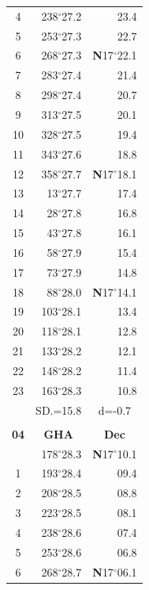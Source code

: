 \documentclass[10pt, a4paper]{report}
\begin{document}
\begin{scriptsize}
\begin{tabular*}{0.2\textwidth}[t]{@{\extracolsep{\fill}}|c|rr|}
4 & 238$^\circ$27.2 & 23.4\\
5 & 253$^\circ$27.3 & 22.7\\[2Pt]
6 & 268$^\circ$27.3 & \textbf{N}17$^\circ$22.1\\
7 & 283$^\circ$27.4 & 21.4\\
8 & 298$^\circ$27.4 & 20.7\\
9 & 313$^\circ$27.5 & \raisebox{0.24ex}{\boldmath$\cdot$~\boldmath$\cdot$~~}20.1\\
10 & 328$^\circ$27.5 & 19.4\\
11 & 343$^\circ$27.6 & 18.8\\[2Pt]
12 & 358$^\circ$27.7 & \textbf{N}17$^\circ$18.1\\
13 & 13$^\circ$27.7 & 17.4\\
14 & 28$^\circ$27.8 & 16.8\\
15 & 43$^\circ$27.8 & \raisebox{0.24ex}{\boldmath$\cdot$~\boldmath$\cdot$~~}16.1\\
16 & 58$^\circ$27.9 & 15.4\\
17 & 73$^\circ$27.9 & 14.8\\[2Pt]
18 & 88$^\circ$28.0 & \textbf{N}17$^\circ$14.1\\
19 & 103$^\circ$28.1 & 13.4\\
20 & 118$^\circ$28.1 & 12.8\\
21 & 133$^\circ$28.2 & \raisebox{0.24ex}{\boldmath$\cdot$~\boldmath$\cdot$~~}12.1\\
22 & 148$^\circ$28.2 & 11.4\\
23 & 163$^\circ$28.3 & 10.8\\
\hline
\rule{0pt}{2.4ex} & \multicolumn{1}{c}{SD.=15.8} & \multicolumn{1}{c|}{d=-0.7}\\
\hline
\multicolumn{1}{c}{}\\[-0.5ex]\hline
\multicolumn{1}{|c|}{\rule{0pt}{2.6ex}\textbf{04}} & \multicolumn{1}{c}{\textbf{GHA}} & \multicolumn{1}{c|}{\textbf{Dec}}\\
\hline\rule{0pt}{2.6ex}\noindent
0 & 178$^\circ$28.3 & \textbf{N}17$^\circ$10.1\\
1 & 193$^\circ$28.4 & 09.4\\
2 & 208$^\circ$28.5 & 08.8\\
3 & 223$^\circ$28.5 & \raisebox{0.24ex}{\boldmath$\cdot$~\boldmath$\cdot$~~}08.1\\
4 & 238$^\circ$28.6 & 07.4\\
5 & 253$^\circ$28.6 & 06.8\\[2Pt]
6 & 268$^\circ$28.7 & \textbf{N}17$^\circ$06.1\\

\end{tabular*}
\end{scriptsize}
\end{document}

